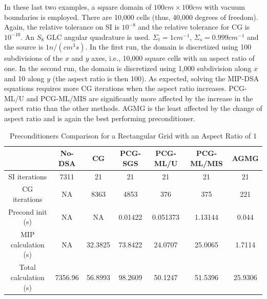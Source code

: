 \documentclass[preprint,10pt]{elsarticle}
\renewcommand{\(}{\left(}
\renewcommand{\)}{\right)}
\renewcommand{\[}{\left[}
\renewcommand{\]}{\right]}
\begin{document}
In these last two examples, a square domain  of $100cm \times 100cm$ with vacuum boundaries
is employed. There are 10,000 cells (thus, 40,000 degrees of freedom). Again, the relative 
tolerance on SI is $10^{-8}$ and the relative tolerance for CG is $10^{-10}$. 
An $S_8$ GLC angular quadrature is used. $\Sigma_t = 1cm^{-1}$, $\Sigma_s = 0.999cm^{-1}$
and the source is $1n/(cm^3s)$. 
In the first run, the domain is discretized using 100 subdivisions of the $x$ and $y$
axes, i.e., 10,000 square cells with an aspect ratio of one. In the second run, 
the domain is discretized using 1,000 subdivision along $x$ and 10 along $y$ 
(the aspect ratio is then 100).
%
As expected, solving the MIP-DSA equations requires more CG iterations when the aspect
ratio increases. PCG-ML/U and PCG-ML/MIS are significantly more affected by the
increase in the aspect ratio than the other methods. AGMG is the least
affected by the change of aspect ratio and is again the best performing
preconditioner.
%
\begin{table}[!htbp]
  \caption{Preconditioners Comparison for a Rectangular Grid with an Aspect Ratio of 1}
  \begin{center}
    \begin{tabular}{|c|c|c|c|c|c|c|}
      \hline
       & No-DSA & CG & PCG-SGS & PCG-ML/U & PCG-ML/MIS & AGMG \\
      \hline
      SI iterations & 7311      & 21      & 21      & 21       & 21      & 21 \\
      CG iterations & NA        & 8363    & 4853    & 376      & 375     & 221\\
\hline
   Precond init (s) & NA        & NA      & 0.01422 & 0.051373 & 1.13144 &  0.044 \\
MIP calculation (s) & NA        & 32.3825 & 73.8422 & 24.0707  & 25.0065 & 1.7114 \\
Total calculation (s) & 7356.96 & 56.8993 & 98.2609 & 50.1247  & 51.5396 &25.9306 \\
      \hline
    \end{tabular}
    \label{table_ar_1}
  \end{center}
\end{table}
%
\end{document}
